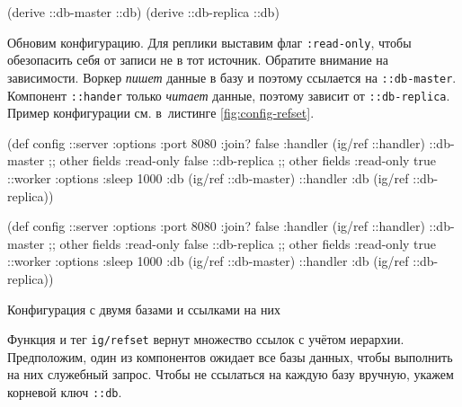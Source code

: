 \begin{english}
  \begin{clojure}
(derive ::db-master ::db)
(derive ::db-replica ::db)
  \end{clojure}
\end{english}

Обновим конфигурацию. Для реплики выставим флаг \verb|:read-only|, чтобы
обезопасить себя от записи не в тот источник. Обратите внимание на
зависимости. Воркер \emph{пишет} данные в базу и поэтому ссылается на
\verb|::db-master|. Компонент \verb|::hander| только \emph{читает} данные,
поэтому зависит от \verb|::db-replica|. Пример конфигурации см. в~листинге
\ref{fig:config-refset}.

\begin{listing}[ht!]

\ifx\DEVICETYPE\MOBILE

\begin{english}
  \begin{clojure}
(def config
  {::server {:options {:port 8080
                       :join? false}
             :handler (ig/ref ::handler)}
   ::db-master {;; other fields
                :read-only false}
   ::db-replica {;; other fields
                 :read-only true}
   ::worker {:options {:sleep 1000}
             :db (ig/ref ::db-master)}
   ::handler {:db (ig/ref
                    ::db-replica)}})
  \end{clojure}
\end{english}

\else

\begin{english}
  \begin{clojure}
(def config
  {::server {:options {:port 8080 :join? false}
             :handler (ig/ref ::handler)}
   ::db-master {;; other fields
                :read-only false}
   ::db-replica {;; other fields
                 :read-only true}
   ::worker {:options {:sleep 1000}
             :db (ig/ref ::db-master)}
   ::handler {:db (ig/ref ::db-replica)}})
  \end{clojure}
\end{english}

\fi

\caption{Конфигурация с двумя базами и ссылками на них}
\label{fig:config-refset}

\end{listing}

Функция и тег \verb|ig/refset| вернут множество ссылок с учётом
иерархии. Предположим, один из компонентов ожидает все базы данных, чтобы
выполнить на них служебный запрос. Чтобы не ссылаться на каждую базу вручную,
укажем корневой ключ \verb|::db|.

